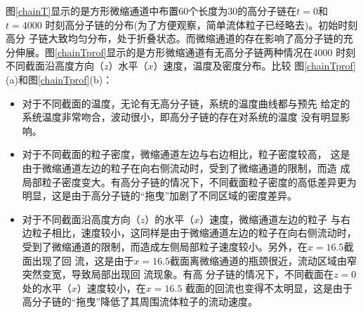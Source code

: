 \documentclass[twoside,12pt]{article}
\begin{document}
图\ref{chainT}显示的是方形微缩通道中布置60个长度为30的高分子链在$t=0$和$t=4000$
时刻高分子链的分布(为了方便观察，简单流体粒子已经略去)。初始时刻高分
子链大致均匀分布，处于折叠状态。而微缩通道的存在影响了高分子链的充
分伸展。图\ref{chainTprof}显示的是方形微缩通道有无高分子链两种情况在4000 时刻不同截面沿高度方向（$z$）水平（$x$）速度，温度及密度分布。比较
图\ref{chainTprof}(a)和图\ref{chainTprof}(b)：
\begin{itemize}
\item  	对于不同截面的温度，无论有无高分子链，系统的温度曲线都与预先
    给定的系统温度非常吻合，波动很小，即高分子链的存在对系统的温度
    没有明显影响。

\item  	对于不同截面的粒子密度，微缩通道左边与右边相比，粒子密度较高，
    这是由于微缩通道左边的粒子在向右侧流动时，受到了微缩通道的限制，而造
    成局部粒子密度变大。有高分子链的情况下，不同截面粒子密度的高低差异更为
    明显，这是由于高分子链的``拖曳''加剧了不同区域的密度差异。

\item  	对于不同截面沿高度方向（$z$）的水平（$x$）速度，微缩通道左边的粒子
    与右边粒子相比，速度较小，这同样是由于微缩通道左边的粒子在向右侧流动时，
    受到了微缩通道的限制，而造成左侧局部粒子速度较小。另外，在$x=16.5$截面出现了回
    流，这是由于$x=16.5$截面离微缩通道的瓶颈很近，流动区域由窄突然变宽，导致局部出现回
    流现象。有高
    分子链的情况下，不同截面在$z=0$处的水平（$x$）速度较小，在$x=16.5$ 截面的回流也变得不太明显，这是由于高分子链的``拖曳''降低了其周围流体粒子的流动速度。
\end{itemize}
\end{document}
